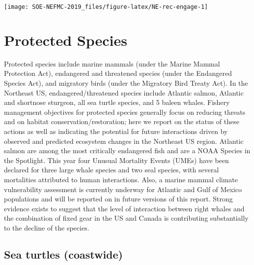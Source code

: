 \documentclass[10pt,]{article}
\let\origfigure\figure
\let\endorigfigure\endfigure
\renewenvironment{figure}[1][2] {
    \expandafter\origfigure\expandafter[H]
} {
    \endorigfigure
}
\begin{document}
\begin{figure}

{\centering \texttt{[image: SOE-NEFMC-2019\_files/figure-latex/NE-rec-engage-1]} 

}

\caption{Recreational engagement (shore, private vessel and for-hire recreational fishing in a community) and reliance (per capita engagement) based on 2016 landings and the ACS running average of 2012-2016 census data.}\label{fig:NE-rec-engage}
\end{figure}

\newpage

\section{Protected Species}\label{protected-species}

Protected species include marine mammals (under the Marine Mammal
Protection Act), endangered and threatened species (under the Endangered
Species Act), and migratory birds (under the Migratory Bird Treaty Act).
In the Northeast US, endangered/threatened species include Atlantic
salmon, Atlantic and shortnose sturgeon, all sea turtle species, and 5
baleen whales. Fishery management objectives for protected species
generally focus on reducing threats and on habitat
conservation/restoration; here we report on the status of these actions
as well as indicating the potential for future interactions driven by
observed and predicted ecosystem changes in the Northeast US region.
Atlantic salmon are among the most critically endangered fish and are a
NOAA Species in the Spotlight. This year four Unusual Mortality Events
(UMEs) have been declared for three large whale species and two seal
species, with several mortalities attributed to human interactions.
Also, a marine mammal climate vulnerability assessment is currently
underway for Atlantic and Gulf of Mexico populations and will be
reported on in future versions of this report. Strong evidence exists to
suggest that the level of interaction between right whales and the
combination of fixed gear in the US and Canada is contributing
substantially to the decline of the species.

\subsection{Sea turtles (coastwide)}\label{sea-turtles-coastwide}
\end{document}
